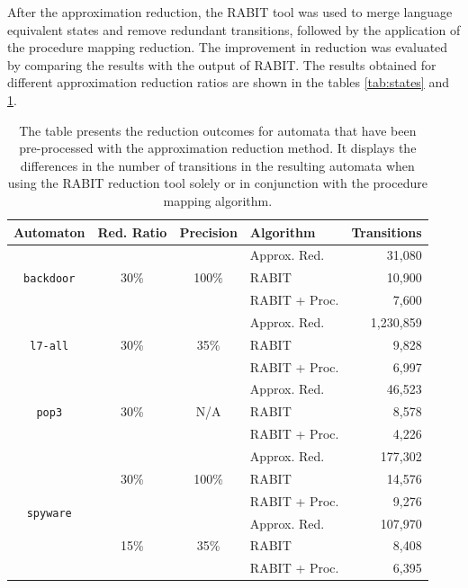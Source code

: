         After the approximation reduction, the RABIT tool was used to merge language equivalent states and remove redundant transitions, followed by the application of the procedure mapping reduction. The improvement in reduction was evaluated by comparing the results with the output of RABIT. The results obtained for different approximation reduction ratios are shown in the tables \ref{tab:states} and \ref{tab:trans}.

        \begin{table}[!h]
            \centering
            \captionsetup{justification=justified}
            \scriptsize
            \begin{tabular}{|c|c|c||l|r|}
                \hline
                Automaton        	& Red. Ratio & Precision & Algorithm & Transitions \\[0.5ex]
                \hline\hline
                \multirow{3}{*}{\texttt{backdoor}} & \multirow{3}{*}{30\%} & \multirow{3}{*}{100\%} & Approx. Red. & 31,080\\[0.5ex]
                & & & RABIT & 10,900\\[0.5ex]
                & & & RABIT + Proc. & 7,600\\[0.5ex]
                \hline
                \multirow{3}{*}{\texttt{l7-all}} & \multirow{3}{*}{30\%} & \multirow{3}{*}{35\%} & Approx. Red. & 1,230,859\\[0.5ex]
                & & & RABIT & 9,828\\[0.5ex]
                & & & RABIT + Proc. & 6,997\\[0.5ex]
                \hline
                \multirow{3}{*}{\texttt{pop3}} & \multirow{3}{*}{30\%} & \multirow{3}{*}{N/A} & Approx. Red. & 46,523\\[0.5ex]
                & & & RABIT & 8,578\\[0.5ex]
                & & & RABIT + Proc. & 4,226\\[0.5ex]
                \hline
                \multirow{6}{*}{\texttt{spyware}} & \multirow{3}{*}{30\%} & \multirow{3}{*}{100\%} & Approx. Red. & 177,302\\[0.5ex]
                & & & RABIT & 14,576\\[0.5ex]
                & & & RABIT + Proc. & 9,276\\[0.5ex]
                \cline{2-5}
                & \multirow{3}{*}{15\%} & \multirow{3}{*}{35\%} & Approx. Red. & 107,970\\[0.5ex]
                & & & RABIT & 8,408\\[0.5ex]
                & & & RABIT + Proc. & 6,395\\[0.5ex]
                \hline
            \end{tabular}
            \normalsize
            \caption{The table presents the reduction outcomes for automata that have been pre-processed with the approximation reduction method. It displays the differences in the number of transitions in the resulting automata when using the RABIT reduction tool solely or in conjunction with the procedure mapping algorithm.}
            \label{tab:trans}
        \end{table}

